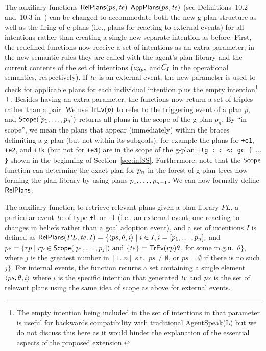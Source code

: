 The auxiliary functions $\mathsf{RelPlans}(ps,\mathit{te})$
$\mathsf{AppPlans}(ps,\mathit{te})$ (see Definitions~10.2 and~10.3
in~\cite{bordini:07}) can be changed to accommodate both the new g-plan
structure as well as the firing of e-plans (i.e., plans for reacting
to external events) for all intentions rather than creating a single
new separate intention as before. First, the redefined functions now
receive a set of intentions as an extra parameter; in the new semantic
rules they are called with the agent's plan library and the current
contents of the set of intentions ($ag_{ps}$ and$C_{I}$ in the
operational semantics, respectively). If $\mathit{te}$ is an external event,
the new parameter is used to check for applicable plans for each
individual intention plus the empty intention\footnote{The empty
  intention being included in the set of intentions in that parameter
  is useful for backwards compatibility with traditional AgentSpeak(L)
  but we do not discuss this here as it would hinder the explanation
  of the essential aspects of the proposed extension.}
$\top$. Besides having an extra parameter, the functions now return a
set of triples rather than a pair. We use $\mathsf{TrEv}(p)$ to refer to the
triggering event of a plan $p$, and $\mathsf{Scope}([p_1,\ldots,p_n])$
returns all plans in the scope of the g-plan $p_n$. By ``in scope'',
we mean the plans that appear (immediately) within the braces
delimiting a g-plan (but not within its subgoals); for example the
plans for \texttt{+e1}, \texttt{+e2}, and \texttt{+!k} (but not for
\texttt{+e3}) are in the scope of the g-plan \texttt{+!g : c <: gc \{
  $\ldots$ \}} shown in the beginning of
Section~\ref{sec:infSS}. Furthermore, note that the $\mathsf{Scope}$ function
can determine the exact plan for $p_n$ in the forest of g-plan trees
now forming the plan library by using plans
$p_1,\ldots,p_{n-1}$. We can now formally define $\mathsf{RelPlans}$:

\begin{definition}\label{def:relplans}
  The auxiliary function to retrieve relevant plans given a plan
  library $PL$, a particular event $\mathit{te}$ of type \texttt{+l} or
  \texttt{-l} (i.e., an external event, one reacting to changes in
  beliefs rather than a goal adoption event), and a set of intentions
  $I$ is defined as
  $\mathsf{RelPlans}(PL,\mathit{te},I) = \{ \langle ps,\theta,i\rangle \mid i \in
  I, i = [p_1,\ldots,p_n],$
  and
  $ps = \{ rp \mid rp \in \mathsf{Scope}([p_1,\ldots,p_j]) \mbox{ and }
  \{\mathit{te}\} \models \mathsf{TrEv}(rp)\theta$,
  for some m.g.u.\ $\theta\}$, where $j$ is the greatest number in
  $[1..n]$ s.t.\ $ps \neq \emptyset$, or $ps=\emptyset$ if there is no
  such $j\}$. For internal events, the function returns a set
  containing a single element $\langle ps,\theta,i\rangle$ where
  $i$ is the specific intention that generated $\mathit{te}$ and $ps$ is
  the set of relevant plans using the same idea of scope as above for
  external events.
\end{definition}

